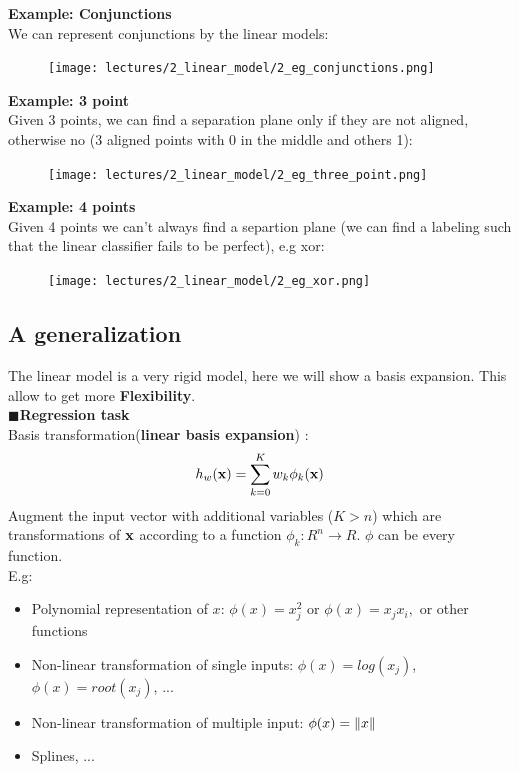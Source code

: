 \documentclass[../main.tex]{subfiles}
\begin{document}
\textbf{Example: Conjunctions}\\
We can represent conjunctions by the linear models:
\begin{figure}[H]
    \centering
    \texttt{[image: lectures/2\_linear\_model/2\_eg\_conjunctions.png]}
\end{figure}

\textbf{Example: 3 point}\\
Given 3 points, we can find a separation plane only if they are not aligned, otherwise no (3 aligned points with 0 in the middle and others 1):

\begin{figure}[H]
    \centering
    \texttt{[image: lectures/2\_linear\_model/2\_eg\_three\_point.png]}
\end{figure}

\textbf{Example: 4 points}\\
Given 4 points we can't always find a separtion plane (we can find a labeling such that the linear classifier fails to be perfect), e.g xor:
\begin{figure}[H]
    \centering
    \texttt{[image: lectures/2\_linear\_model/2\_eg\_xor.png]}
\end{figure}


\subsection{A generalization}
The linear model is a very rigid model, here we will show a basis expansion. This allow to get more \textbf{Flexibility}.\\

\noindent$\blacksquare$\textbf{Regression task}\\
Basis transformation(\textbf{linear basis expansion}) :
$$h_w(\bold{x})=\sum_{k = 0}^{K} w_k\phi_k(\bold{x})$$
Augment the input vector with additional variables ($K>n$) which are transformations of $\bold{x}$ according to a function $\phi_k: R^n\rightarrow R$. $\phi$ can be every function.\\

E.g:
\begin{itemize}
    \item Polynomial representation of $x$: $\phi(x) = x_j^2$ or $\phi(x) = x_jx_i,$ or other functions
    \item Non-linear transformation of single inputs: $\phi(x) = log(x_j)$, $\phi(x) = root(x_j)$, ...
    \item Non-linear transformation of multiple input: $\phi(x) = \left\lVert x\right\rVert$
    \item Splines, ...
\end{itemize}
\end{document}
